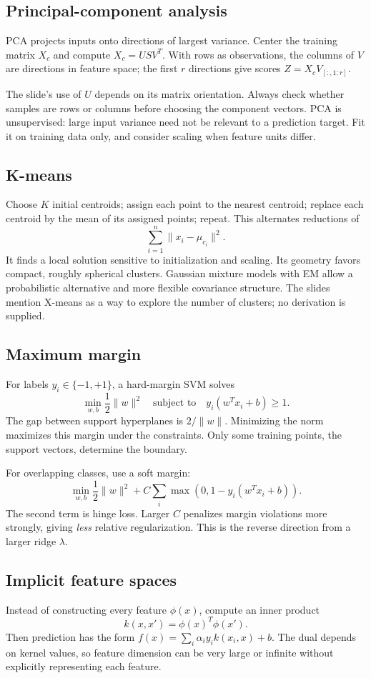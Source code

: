 \documentclass[11pt]{article}
\begin{document}
\subsection{Principal-component analysis}
PCA projects inputs onto directions of largest variance. Center the training matrix $X_c$ and compute $X_c=USV^T$. With rows as observations, the columns of $V$ are directions in feature space; the first $r$ directions give scores $Z=X_cV_{[:,1:r]}$.

The slide's use of $U$ depends on its matrix orientation. Always check whether samples are rows or columns before choosing the component vectors. PCA is unsupervised: large input variance need not be relevant to a prediction target. Fit it on training data only, and consider scaling when feature units differ.
\subsection{K-means}
Choose $K$ initial centroids; assign each point to the nearest centroid; replace each centroid by the mean of its assigned points; repeat. This alternates reductions of
\[
\sum_{i=1}^n\|x_i-\mu_{c_i}\|^2.
\]
It finds a local solution sensitive to initialization and scaling. Its geometry favors compact, roughly spherical clusters. Gaussian mixture models with EM allow a probabilistic alternative and more flexible covariance structure. The slides mention X-means as a way to explore the number of clusters; no derivation is supplied.
\subsection{Maximum margin}
For labels $y_i\in\{-1,+1\}$, a hard-margin SVM solves
\[
\min_{w,b}\frac12\|w\|^2\quad\text{subject to}\quad
y_i(w^Tx_i+b)\geq1.
\]
The gap between support hyperplanes is $2/\|w\|$. Minimizing the norm maximizes this margin under the constraints. Only some training points, the support vectors, determine the boundary.

For overlapping classes, use a soft margin:
\[
\min_{w,b}\frac12\|w\|^2+C\sum_i\max(0,1-y_i(w^Tx_i+b)).
\]
The second term is hinge loss. Larger $C$ penalizes margin violations more strongly, giving \emph{less} relative regularization. This is the reverse direction from a larger ridge $\lambda$.
\subsection{Implicit feature spaces}
Instead of constructing every feature $\phi(x)$, compute an inner product
\[
k(x,x')=\phi(x)^T\phi(x').
\]
Then prediction has the form $f(x)=\sum_i\alpha_i y_i k(x_i,x)+b$. The dual depends on kernel values, so feature dimension can be very large or infinite without explicitly representing each feature.
\end{document}
